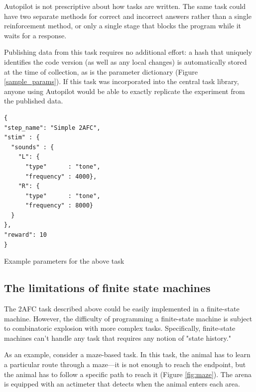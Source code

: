 \documentclass[nohyper, justified, notitlepage, marginals=raggedright,twoside=false,debug]{tufte-autopilot}
\begin{document}
Autopilot is not prescriptive about how tasks are written. The same task could have two separate methods for correct and incorrect answers rather than a single reinforcement method, or only a single stage that blocks the program while it waits for a response.

Publishing data from this task requires no additional effort: a hash that uniquely identifies the code version (as well as any local changes) is automatically stored at the time of collection, as is the parameter dictionary (Figure \ref{sample_params}). If this task was incorporated into the central task library, anyone using Autopilot would be able to exactly replicate the experiment from the published data.
\begin{marginfigure}[-2.8cm]
\begin{verbatim}
{
"step_name": "Simple 2AFC",
"stim" : {
  "sounds" : {
    "L": {
      "type"      : "tone",
      "frequency" : 4000},
    "R": {
      "type"      : "tone",
      "frequency" : 8000}
  }
},
"reward": 10
}
\end{verbatim}
\caption{Example parameters for the above task}
\label{sample_params}
\end{marginfigure}

\subsection{The limitations of finite state machines}
\label{sec:fsmlimits}

The 2AFC task described above could be easily implemented in a finite-state machine. However, the difficulty of programming a finite-state machine is subject to combinatoric explosion with more complex tasks. Specifically, finite-state machines can't handle any task that requires any notion of "state history." 

As an example, consider a maze-based task. In this task, the animal has to learn a particular route through a maze---it is not enough to reach the endpoint, but the animal has to follow a specific path to reach it (Figure \ref{fig:maze}). The arena is equipped with an actimeter that detects when the animal enters each area.
\end{document}
